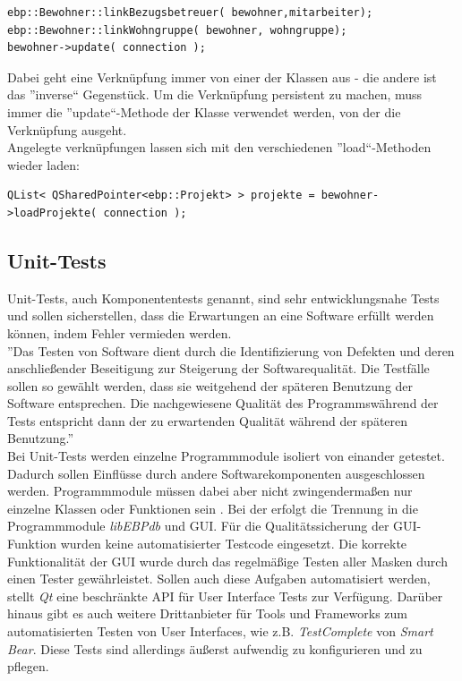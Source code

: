 \begin{lstlisting}
ebp::Bewohner::linkBezugsbetreuer( bewohner,mitarbeiter);
ebp::Bewohner::linkWohngruppe( bewohner, wohngruppe);
bewohner->update( connection );
\end{lstlisting}
Dabei geht eine Verknüpfung immer von einer der Klassen aus - die andere ist das ''inverse`` Gegenstück.
Um die Verknüpfung persistent zu machen, muss immer die ''update``-Methode der Klasse verwendet werden, von der die Verknüpfung ausgeht.\\
Angelegte verknüpfungen lassen sich mit den verschiedenen ''load``-Methoden wieder laden:\\
\begin{lstlisting}
QList< QSharedPointer<ebp::Projekt> > projekte = bewohner->loadProjekte( connection );
\end{lstlisting}

\newpage

\subsection{Unit-Tests}

Unit-Tests, auch Komponententests genannt, sind sehr entwicklungsnahe Tests und sollen sicherstellen, dass die Erwartungen an eine Software erfüllt
werden können, indem Fehler vermieden werden.\\
''Das Testen von Software dient durch die Identifizierung von Defekten und deren anschließender Beseitigung zur Steigerung der Softwarequalität. Die 
Testfälle sollen so gewählt werden, dass sie weitgehend der späteren Benutzung der Software entsprechen. Die nachgewiesene Qualität des
Programmswährend der Tests entspricht dann der zu erwartenden Qualität während der späteren Benutzung\cite[S. 11]{Softwaretests}.''\\

Bei Unit-Tests werden einzelne Programmmodule isoliert von einander getestet. Dadurch sollen Einflüsse durch andere Softwarekomponenten ausgeschlossen
werden. Programmmodule müssen dabei aber nicht zwingendermaßen nur einzelne Klassen oder Funktionen sein \cite[Vgl. S. 11]{Softwaretests}. Bei der
\EBP erfolgt die Trennung in die Programmmodule \textit{libEBPdb} und GUI. Für die Qualitätssicherung der GUI-Funktion wurden keine automatisierter Testcode
eingesetzt. Die korrekte Funktionalität der GUI wurde durch das regelmäßige Testen aller Masken durch einen Tester gewährleistet. Sollen auch diese
Aufgaben automatisiert werden, stellt \textit{Qt} eine beschränkte API für User Interface Tests zur Verfügung. Darüber hinaus gibt es auch weitere
Drittanbieter für Tools und Frameworks zum automatisierten Testen von User Interfaces, wie z.B. \textit{TestComplete} von \textit{Smart Bear}. Diese Tests sind
allerdings äußerst aufwendig zu konfigurieren und zu pflegen.\\

